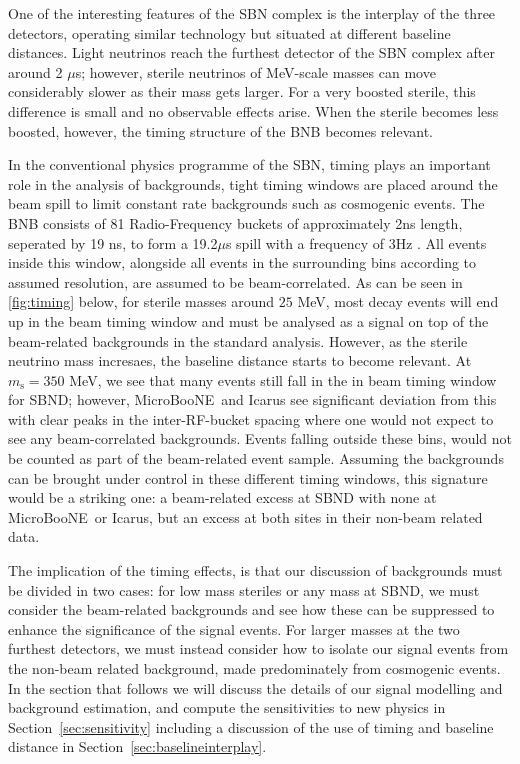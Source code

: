 \documentclass[11pt, a4paper]{article}
\newcommand{\refsec}[1]{Section~\ref{#1}}
\def\muboone{MicroBooNE}
\begin{document}
One of the interesting features of the SBN complex is the interplay of the
three detectors, operating similar technology but situated at different
baseline distances.
%
Light neutrinos reach the furthest detector of the SBN complex after around 2
$\mu$s; however, sterile neutrinos of MeV-scale masses can move considerably
slower as their mass gets larger. For a very boosted sterile, this difference
is small and no observable effects arise. When the sterile becomes less
boosted, however, the timing structure of the BNB becomes relevant.

In the conventional physics programme of the SBN, timing plays an important
role in the analysis of backgrounds, tight timing windows are placed around the
beam spill to limit constant rate backgrounds such as cosmogenic events. The
BNB consists of 81 Radio-Frequency buckets of approximately 2ns length,
seperated by 19 ns, to form a 19.2$\mu$s spill with a frequency of 3Hz
\cite{Antonello:2015ea}.  All events inside this window, alongside all events
in the surrounding bins according to assumed resolution, are assumed to be
beam-correlated.  As can be seen in \ref{fig:timing} below, for sterile masses
around $25$ MeV, most decay events will end up in the beam timing window and
must be analysed as a signal on top of the beam-related backgrounds in the
standard analysis. However, as the sterile neutrino mass incresaes, the
baseline distance starts to become relevant. At $m_{\text{s}}=350$ MeV, we see
that many events still fall in the in beam timing window for SBND; however,
\muboone\ and Icarus see significant deviation from this with clear peaks in
the inter-RF-bucket spacing where one would not expect to see any
beam-correlated backgrounds. Events falling outside these bins, would not be
counted as part of the beam-related event sample. Assuming the backgrounds can
be brought under control in these different timing windows, this signature
would be a striking one: a beam-related excess at SBND with none at \muboone\
or Icarus, but an excess at both sites in their non-beam related data.

The implication of the timing effects, is that our discussion of backgrounds
must be divided in two cases: for low mass steriles or any mass at SBND, we
must consider the beam-related backgrounds and see how these can be suppressed
to enhance the significance of the signal events. For larger masses at the two
furthest detectors, we must instead consider how to isolate our signal events
from the non-beam related background, made predominately from cosmogenic
events. In the section that follows we will discuss the details of our signal
modelling and background estimation, and compute the sensitivities to new
physics in \refsec{sec:sensitivity} including a discussion of the 
use of timing and baseline distance in \refsec{sec:baselineinterplay}. 
\end{document}
